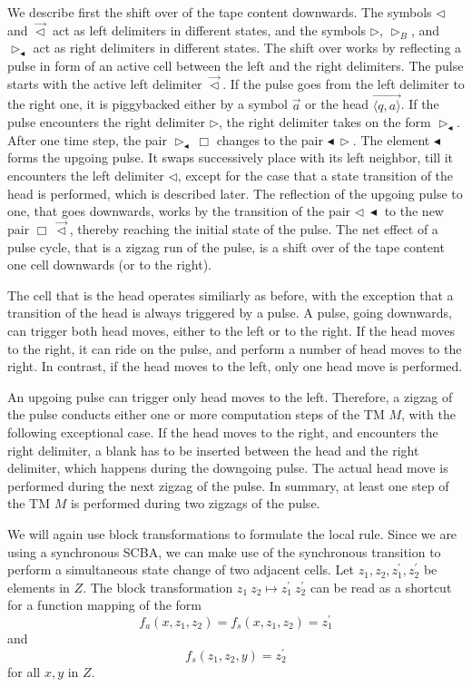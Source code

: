 \documentclass[pre,amssymb,showpacs,showkeys,preprint]{revtex4}
\begin{document}
We describe first the shift over of the tape content downwards.
The symbols $\lhd$ and $\vec{\lhd}$ act as left delimiters in different states, and the
symbols $\rhd$, $\rhd_B$, and $\rhd_\blacktriangleleft$ act as right delimiters in different states.
The shift over works by reflecting a pulse in form of an active cell between the left and the right
delimiters.
The pulse starts with the active left delimiter $\overrightarrow{\lhd}$.
If the pulse goes from the left delimiter to the right one, it is piggybacked either by a symbol
$\overrightarrow{a}$ or the head $\overrightarrow{\langle q, a \rangle}$.
If the pulse encounters the right delimiter $\rhd$, the right delimiter takes on the form
 $\rhd_\blacktriangleleft$.
After one time step, the pair $\rhd_\blacktriangleleft \: \Box$ changes to
the pair $\blacktriangleleft \:  \rhd$.
The element $\blacktriangleleft$ forms the upgoing pulse.
It swaps successively place with its left neighbor, till it encounters the left delimiter $\lhd$,
except for the case that a state transition of the head is performed, which is described later.
The reflection of the upgoing pulse to one, that goes downwards, works by the transition
of the pair $\lhd \: \blacktriangleleft$ to the new pair $\Box \: \vec{\lhd}$, thereby
reaching the initial state of the pulse.
The net effect of a pulse cycle, that is a zigzag run of the pulse, is a shift over of the
tape content one cell downwards (or to the right).

The cell that is the head operates similiarly as before, with the exception that
a transition of the head is always triggered by a pulse.
A pulse, going downwards, can trigger both head moves, either to the left or to the right.
If the head moves to the right, it can ride on the pulse, and perform a number of head moves to
the right. In contrast, if the head moves to the left, only one head move is performed.

An upgoing pulse can trigger only head moves to the left.
Therefore, a zigzag of the pulse conducts either one or more computation steps of the TM $M$, with
the following exceptional case.
If the head moves to the right, and encounters the right delimiter, a blank has to be inserted
between the head and the right delimiter, which happens during the downgoing pulse.
The actual head move is performed during the next zigzag of the pulse.
In summary, at least one step of the TM $M$ is performed during two zigzags of the pulse.

We will again use block transformations to formulate the local rule.
Since we are using a synchronous SCBA, we can make use of the synchronous transition to
perform a simultaneous state change of two adjacent cells.
Let $z_1, z_2, z_1^\prime, z_2^\prime$ be elements in $Z$.
The block transformation $z_1 \: z_2 \mapsto z_1^\prime \: z_2^\prime$ can be read as a shortcut
for a function mapping of the form
\[
f_a(x, z_1, z_2) = f_s(x, z_1, z_2) = z_1^\prime
\]
and
\[
f_s(z_1, z_2,y) = z_2^\prime
\]
for all $x, y$ in $Z$.
\end{document}
